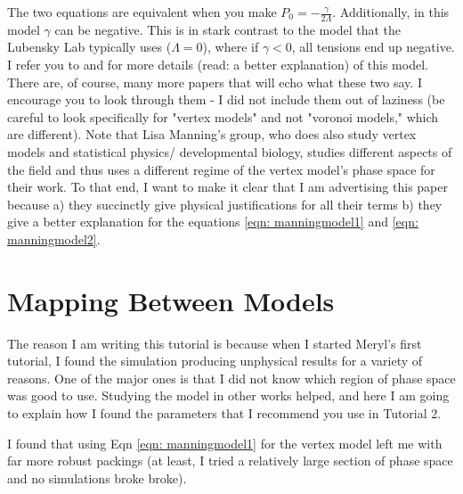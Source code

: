 \documentclass[12pt,a4paper]{article}
\begin{document}
The two equations are equivalent when you make $P_0 = -\frac{\gamma}{2 \Lambda}$. Additionally, in this model $\gamma$ can be negative. This is in stark contrast to the model that the Lubensky Lab typically uses ($\Lambda = 0$), where if $\gamma < 0$, all tensions end up negative. I refer you to \cite{1} and \cite{2} for more details (read: a better explanation) of this model. There are, of course, many more papers that will echo what these two say. I encourage you to look through them - I did not include them out of laziness (be careful to look specifically for "vertex models" and not "voronoi models," which are different). Note that Lisa Manning's group, who does also study vertex models and statistical physics/ developmental biology, studies different aspects of the field and thus uses a different regime of the vertex model's phase space for their work. To that end, I want to make it clear that I am advertising this paper because a) they succinctly give physical justifications for all their terms b) they give a better explanation for the equations \ref{eqn: manningmodel1} and \ref{eqn: manningmodel2}. 

\section{Mapping Between Models}

The reason I am writing this tutorial is because when I started Meryl's first tutorial, I found the simulation producing unphysical results for a variety of reasons. One of the major ones is that I did not know which region of phase space was good to use. Studying the model in other works helped, and here I am going to explain how I found the parameters that I recommend you use in Tutorial 2. 

I found that using Eqn \ref{eqn: manningmodel1} for the vertex model left me with far more robust packings (at least, I tried a relatively large section of phase space and no simulations broke broke). 
\end{document}

